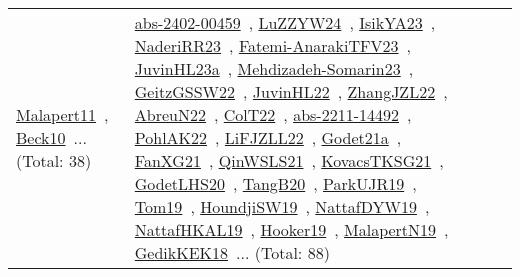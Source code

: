 {\begin{longtable}{lp{3cm}>{\raggedright\arraybackslash}p{6cm}>{\raggedright\arraybackslash}p{6cm}>{\raggedright\arraybackslash}p{8cm}}
\href{../works/Malapert11.pdf}{Malapert11}~\cite{Malapert11}, \href{../works/Beck10.pdf}{Beck10}~\cite{Beck10}... (Total: 38) & \href{../works/abs-2402-00459.pdf}{abs-2402-00459}~\cite{abs-2402-00459}, \href{../works/LuZZYW24.pdf}{LuZZYW24}~\cite{LuZZYW24}, \href{../works/IsikYA23.pdf}{IsikYA23}~\cite{IsikYA23}, \href{../works/NaderiRR23.pdf}{NaderiRR23}~\cite{NaderiRR23}, \href{../works/Fatemi-AnarakiTFV23.pdf}{Fatemi-AnarakiTFV23}~\cite{Fatemi-AnarakiTFV23}, \href{../works/JuvinHL23a.pdf}{JuvinHL23a}~\cite{JuvinHL23a}, \href{../works/Mehdizadeh-Somarin23.pdf}{Mehdizadeh-Somarin23}~\cite{Mehdizadeh-Somarin23}, \href{../works/GeitzGSSW22.pdf}{GeitzGSSW22}~\cite{GeitzGSSW22}, \href{../works/JuvinHL22.pdf}{JuvinHL22}~\cite{JuvinHL22}, \href{../works/ZhangJZL22.pdf}{ZhangJZL22}~\cite{ZhangJZL22}, \href{../works/AbreuN22.pdf}{AbreuN22}~\cite{AbreuN22}, \href{../works/ColT22.pdf}{ColT22}~\cite{ColT22}, \href{../works/abs-2211-14492.pdf}{abs-2211-14492}~\cite{abs-2211-14492}, \href{../works/PohlAK22.pdf}{PohlAK22}~\cite{PohlAK22}, \href{../works/LiFJZLL22.pdf}{LiFJZLL22}~\cite{LiFJZLL22}, \href{../works/Godet21a.pdf}{Godet21a}~\cite{Godet21a}, \href{../works/FanXG21.pdf}{FanXG21}~\cite{FanXG21}, \href{../works/QinWSLS21.pdf}{QinWSLS21}~\cite{QinWSLS21}, \href{../works/KovacsTKSG21.pdf}{KovacsTKSG21}~\cite{KovacsTKSG21}, \href{../works/GodetLHS20.pdf}{GodetLHS20}~\cite{GodetLHS20}, \href{../works/TangB20.pdf}{TangB20}~\cite{TangB20}, \href{../works/ParkUJR19.pdf}{ParkUJR19}~\cite{ParkUJR19}, \href{../works/Tom19.pdf}{Tom19}~\cite{Tom19}, \href{../works/HoundjiSW19.pdf}{HoundjiSW19}~\cite{HoundjiSW19}, \href{../works/NattafDYW19.pdf}{NattafDYW19}~\cite{NattafDYW19}, \href{../works/NattafHKAL19.pdf}{NattafHKAL19}~\cite{NattafHKAL19}, \href{../works/Hooker19.pdf}{Hooker19}~\cite{Hooker19}, \href{../works/MalapertN19.pdf}{MalapertN19}~\cite{MalapertN19}, \href{../works/GedikKEK18.pdf}{GedikKEK18}~\cite{GedikKEK18}... (Total: 88)\\
\end{longtable}
}

